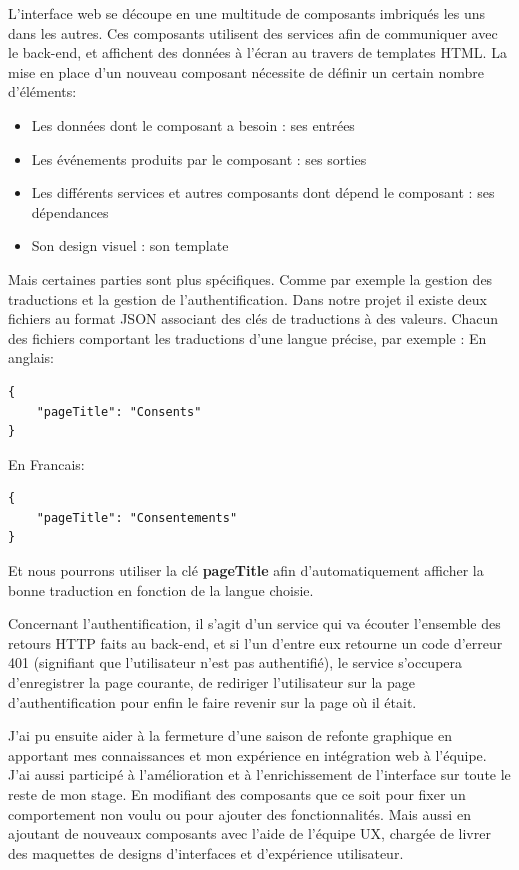 \documentclass[12pt, a4paper]{report}
\begin{document}
L'interface web se découpe en une multitude de composants imbriqués les uns dans les autres.
Ces composants utilisent des services afin de communiquer avec le back-end, et affichent des données à l'écran au travers de templates HTML.
La mise en place d'un nouveau composant nécessite de définir un certain nombre d'éléments:
\begin{itemize}
    \item Les données dont le composant a besoin : ses entrées
    \item Les événements produits par le composant : ses sorties
    \item Les différents services et autres composants dont dépend le composant : ses dépendances
    \item Son design visuel : son template\newline
\end{itemize}
Mais certaines parties sont plus spécifiques. Comme par exemple la gestion des traductions et la gestion de l'authentification.
Dans notre projet il existe deux fichiers au format JSON associant des clés de traductions à des valeurs. Chacun des fichiers comportant les traductions d'une langue précise, par exemple :\newline
En anglais:
\begin{lstlisting}
{
    "pageTitle": "Consents"
}
\end{lstlisting}
En Francais:
\begin{lstlisting}
{
    "pageTitle": "Consentements"
}
\end{lstlisting}
Et nous pourrons utiliser la clé \textbf{pageTitle} afin d'automatiquement afficher la bonne traduction en fonction de la langue choisie.\newline

Concernant l'authentification, il s'agit d'un service qui va écouter l'ensemble des retours HTTP faits au back-end, et si l'un d'entre eux retourne un code d'erreur 401 (signifiant que l'utilisateur n'est pas authentifié), le service s'occupera d'enregistrer la page courante, de rediriger l'utilisateur sur la page d'authentification pour enfin le faire revenir sur la page où il était.\newline

J'ai pu ensuite aider à la fermeture d'une saison de refonte graphique en apportant mes connaissances et mon expérience en intégration web à l'équipe.\newline
J'ai aussi participé à l'amélioration et à l'enrichissement de l'interface sur toute le reste de mon stage. En modifiant des composants que ce soit pour fixer un comportement non voulu ou pour ajouter des fonctionnalités. Mais aussi en ajoutant de nouveaux composants avec l'aide de l'équipe UX, chargée de livrer des maquettes de designs d'interfaces et d'expérience utilisateur.\newline
\end{document}
